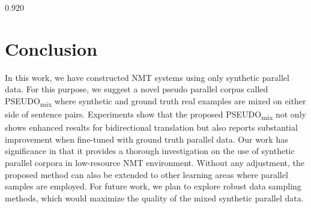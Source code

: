 \documentclass[11pt,letterpaper]{article}
\newcommand{\mylinespacing}{0.920}
\begin{document}
\begin{spacing}{\mylinespacing}
\section{Conclusion}
In this work, we have constructed NMT systems using only synthetic parallel data. For this purpose, we suggest a novel pseudo parallel corpus called PSEUDO\textsubscript{mix} where synthetic and ground truth real examples are mixed on either side of sentence pairs. Experiments show that the proposed PSEUDO\textsubscript{mix} not only shows enhanced results for bidirectional translation but also reports substantial improvement when fine-tuned with ground truth parallel data. Our work has significance in that it provides a thorough investigation on the use of synthetic parallel corpora in low-resource NMT environment. Without any adjustment, the proposed method can also be extended to other learning areas where parallel samples are employed. For future work, we plan to explore robust data sampling methods, which would maximize the quality of the mixed synthetic parallel data.

\end{spacing}



\end{document}
